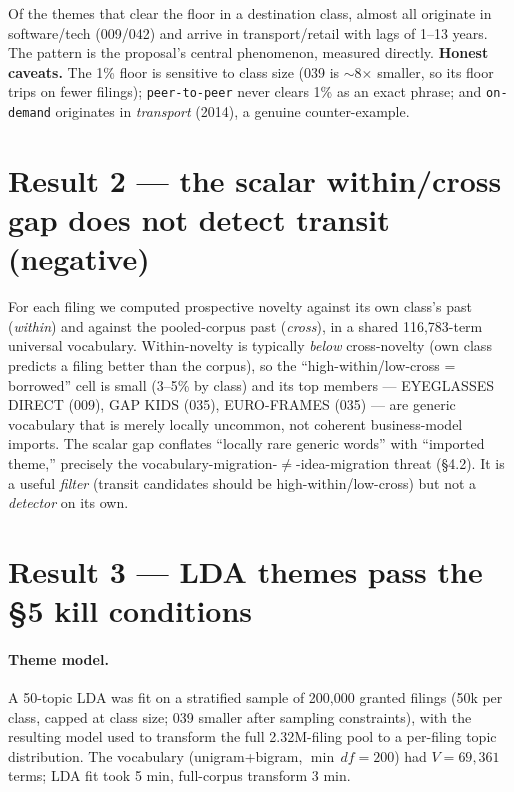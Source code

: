\documentclass[11pt]{report}
\begin{document}
\noindent Of the themes that clear the floor in a destination class, almost all
originate in software/tech (009/042) and arrive in transport/retail with lags of
1--13 years. The pattern is the proposal's central phenomenon, measured directly.
\textbf{Honest caveats.} The 1\% floor is sensitive to class size (039 is
$\sim$8$\times$ smaller, so its floor trips on fewer filings);
\texttt{peer-to-peer} never clears 1\% as an exact phrase; and \texttt{on-demand}
originates in \emph{transport} (2014), a genuine counter-example.

\section{Result 2 --- the scalar within/cross gap does not detect transit (negative)}
For each filing we computed prospective novelty against its own class's past
(\textit{within}) and against the pooled-corpus past (\textit{cross}), in a shared
116{,}783-term universal vocabulary. Within-novelty is typically \emph{below}
cross-novelty (own class predicts a filing better than the corpus), so the
``high-within/low-cross = borrowed'' cell is small (3--5\% by class) and its top
members --- EYEGLASSES DIRECT (009), GAP KIDS (035), EURO-FRAMES (035) --- are
generic vocabulary that is merely locally uncommon, not coherent business-model
imports. The scalar gap conflates ``locally rare generic words'' with ``imported
theme,'' precisely the vocabulary-migration-$\neq$-idea-migration threat (§4.2).
It is a useful \emph{filter} (transit candidates should be high-within/low-cross)
but not a \emph{detector} on its own.

\section{Result 3 --- LDA themes pass the §5 kill conditions}

\paragraph{Theme model.} A 50-topic LDA was fit on a stratified sample of 200{,}000
granted filings (50k per class, capped at class size; 039 smaller after sampling
constraints), with the resulting model used to transform the full 2.32M-filing
pool to a per-filing topic distribution. The vocabulary (unigram+bigram,
$\min\,df=200$) had $V=69{,}361$ terms; LDA fit took 5 min, full-corpus
transform 3 min.
\end{document}

